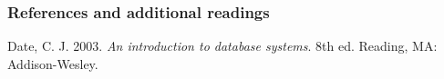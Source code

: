 \documentclass[
]{article}
\begin{document}
\hypertarget{references-and-additional-readings}{%
\subsubsection*{References and additional
readings}\label{references-and-additional-readings}}

Date, C. J. 2003. \emph{An introduction to database systems}. 8th ed.
Reading, MA: Addison-Wesley.
\end{document}
